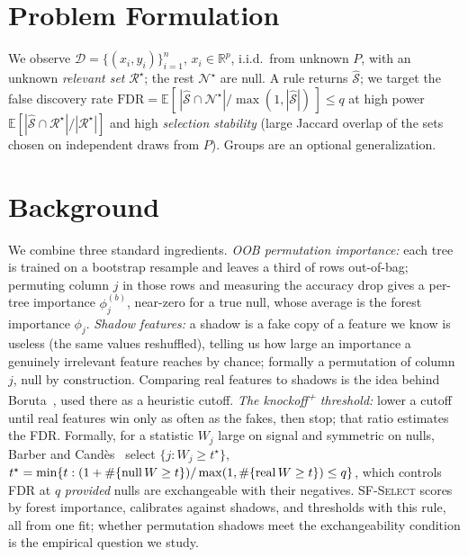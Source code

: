 \documentclass[conference]{IEEEtran}
\begin{document}
\section{Problem Formulation}\label{sec:formulation}
We observe $\mathcal{D}=\{(x_i,y_i)\}_{i=1}^n$, $x_i\in\mathbb{R}^p$, i.i.d.\
from unknown $P$, with an unknown \emph{relevant set}
$\mathcal{R}^\star$; the rest $\mathcal{N}^\star$ are null. A rule returns
$\hat{\mathcal{S}}$; we target the false discovery rate
$\mathrm{FDR}=\mathbb{E}[\,|\hat{\mathcal{S}}\cap\mathcal{N}^\star|/
\max(1,|\hat{\mathcal{S}}|)\,]\le q$ at high power
$\mathbb{E}[|\hat{\mathcal{S}}\cap\mathcal{R}^\star|/|\mathcal{R}^\star|]$ and
high \emph{selection stability} (large Jaccard overlap of the sets chosen on
independent draws from $P$). Groups are an optional
generalization.

\section{Background}\label{sec:bg}
We combine three standard ingredients. \emph{OOB permutation importance:} each
tree is trained on a bootstrap resample and leaves a third of rows out-of-bag;
permuting column $j$ in those rows and measuring the accuracy drop gives a
per-tree importance $\phi_j^{(b)}$, near-zero for a true null, whose average is
the forest importance $\phi_j$. \emph{Shadow features:} a shadow is a fake copy
of a feature we know is useless (the same values reshuffled), telling us how
large an importance a genuinely irrelevant feature reaches by chance; formally a
permutation of column $j$, null by construction. Comparing real features to
shadows is the idea behind Boruta~\cite{boruta}, used there as a heuristic
cutoff. \emph{The knockoff\textsuperscript{+} threshold:} lower a cutoff until
real features win only as often as the fakes, then stop; that ratio estimates the
FDR. Formally, for a statistic $W_j$ large on signal and symmetric on nulls,
Barber and Cand\`es~\cite{barber2015} select $\{j:W_j\ge t^\star\}$,
$t^\star=\min\{t:(1+\#\{{\rm null}\,W\ge t\})/\max(1,\#\{{\rm real}\,W\ge t\})\le
q\}$, which controls FDR at $q$ \emph{provided} nulls are exchangeable with their
negatives. \textsc{SF-Select} scores by forest importance, calibrates against
shadows, and thresholds with this rule, all from one fit; whether permutation
shadows meet the exchangeability condition is the empirical question we study.
\end{document}
